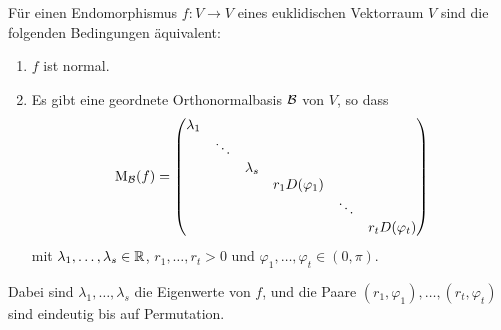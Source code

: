 \begin{theorem}\label{thrm: normal form for real normal endomorphisms}
  Für einen Endomorphismus $f \colon V \to V$ eines euklidischen Vektorraum $V$ sind die folgenden Bedingungen äquivalent:
  \begin{enumerate}[leftmargin=*, label=\roman*)]
    \item
      $f$ ist normal.
    \item
      Es gibt eine geordnete Orthonormalbasis $\mathcal{B}$ von $V$, so dass
      \[
        \mathrm{M}_{\mathcal{B}}(f)
        =
        \begin{pmatrix}
          \lambda_1 &         &           &                   &         &                   \\
                    & \ddots  &           &                   &         &                   \\
                    &         & \lambda_s &                   &         &                   \\
                    &         &           & r_1 D(\varphi_1)  &         &                   \\
                    &         &           &                   & \ddots  &                   \\
                    &         &           &                   &         & r_t D(\varphi_t)
        \end{pmatrix}
      \]
      mit $\lambda_1, \dotsc, \lambda_s \in \mathbb{R}$, $r_1, \dotsc, r_t > 0$ und $\varphi_1, \dotsc, \varphi_t \in (0, \pi)$.
  \end{enumerate}
  Dabei sind $\lambda_1, \dotsc, \lambda_s$ die Eigenwerte von $f$, und die Paare $(r_1, \varphi_1), \dotsc, (r_t, \varphi_t)$ sind eindeutig bis auf Permutation.
\end{theorem}


